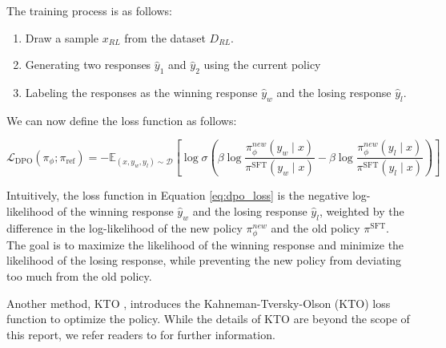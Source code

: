 The training process is as follows:
\begin{enumerate}
    \item Draw a sample $x_{RL}$ from the dataset $D_{RL}$.
    \item Generating two responses $\hat{y}_{1}$ and $\hat{y}_{2}$ using the current policy
    \item Labeling the responses as the winning response $\hat{y}_{w}$ and the losing response $\hat{y}_{l}$.
\end{enumerate}

We can now define the loss function as follows:

\begin{equation}
    \mathcal{L}_{\text{DPO}}(\pi_\phi; \pi_{\text{ref}}) = 
- \mathbb{E}_{(x, y_w, y_l) \sim \mathcal{D}} 
\left[
\log \sigma \left(
\beta \log \frac{\pi_\phi^{new}(y_w \mid x)}{\pi^{\text{SFT}}(y_w \mid x)}
- \beta \log \frac{\pi_\phi^{new}(y_l \mid x)}{\pi^{\text{SFT}}(y_l \mid x)}
\right)
\right] \label{eq:dpo_loss}
\end{equation}

Intuitively, the loss function in Equation \ref{eq:dpo_loss} is the negative log-likelihood of the winning response
$\hat{y}_{w}$ and the losing response $\hat{y}_{l}$, weighted by the difference in the log-likelihood of the new policy
$\pi_{\phi}^{new}$ and the old policy $\pi^{\text{SFT}}$. The goal is to maximize the likelihood of the winning response
and minimize the likelihood of the losing response, while preventing the new policy from deviating too much from the old policy.

Another method, KTO \cite{ethayarajhKTOModelAlignment2024}, introduces the Kahneman-Tversky-Olson (KTO) loss function to optimize the policy. While the details of KTO are beyond the scope of this report, we refer readers to \cite{ethayarajhKTOModelAlignment2024} for further information.